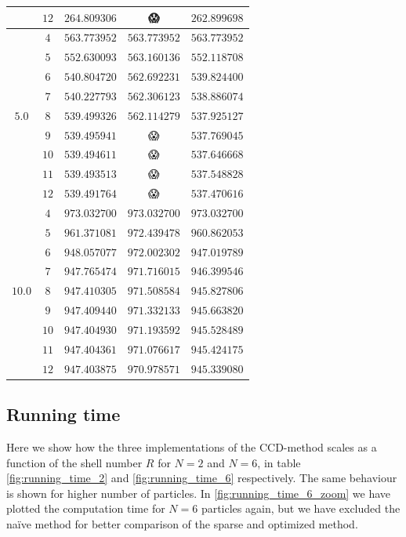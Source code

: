\documentclass[
    a4paper, aps, twocolumn, floatfix, superscriptaddress,
    nofootinbib]{revtex4-1}
\newcommand{\nan}{{\DejaSans 😱}}
\newcommand{\1}{\mathds{1}}
\begin{document}
\begin{table}
\begin{ruledtabular}
\begin{tabular}{c|c|ccc}
                          & $12$ & $264.809306$ & \nan & $262.899698$ \\
                    \hline
                          & $4$ & $563.773952$ & $563.773952$ & $563.773952$ \\
                          & $5$ & $552.630093$ & $563.160136$ & $552.118708$ \\
                          & $6$ & $540.804720$ & $562.692231$ & $539.824400$ \\
                          & $7$ & $540.227793$ & $562.306123$ & $538.886074$ \\
                    $5.0$ & $8$ & $539.499326$ & $562.114279$ & $537.925127$ \\
                          & $9$ & $539.495941$ & \nan & $537.769045$ \\
                          & $10$ & $539.494611$ & \nan & $537.646668$ \\
                          & $11$ & $539.493513$ & \nan & $537.548828$ \\
                          & $12$ & $539.491764$ & \nan & $537.470616$ \\
                    \hline
                           & $4$ & $973.032700$ & $973.032700$ & $973.032700$ \\
                           & $5$ & $961.371081$ & $972.439478$ & $960.862053$ \\
                           & $6$ & $948.057077$ & $972.002302$ & $947.019789$ \\
                           & $7$ & $947.765474$ & $971.716015$ & $946.399546$ \\
                    $10.0$ & $8$ & $947.410305$ & $971.508584$ & $945.827806$ \\
                           & $9$ & $947.409440$ & $971.332133$ & $945.663820$ \\
                           & $10$ & $947.404930$ & $971.193592$ & $945.528489$ \\
                           & $11$ & $947.404361$ & $971.076617$ & $945.424175$ \\
                           & $12$ & $947.403875$ & $970.978571$ & $945.339080$ \\
                \end{tabular}
            \end{ruledtabular}
            \label{tab:N20}
        \end{table}

    \subsection{Running time}
        Here we show how the three implementations of the CCD-method scales as a
        function of the shell number $R$ for $N = 2$ and $N = 6$, in table 
        \ref{fig:running_time_2} and \ref{fig:running_time_6} respectively. The same
        behaviour is shown for higher number of particles. In \autoref{fig:running_time_6_zoom}
        we have plotted the computation time for $N=6$ particles again, but we
        have excluded the naïve method for better comparison of the sparse and
        optimized method.
\end{document}
